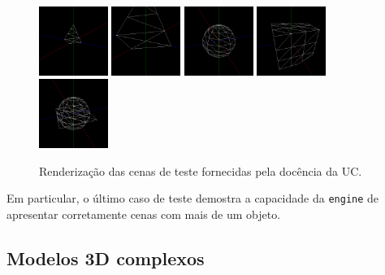 \documentclass[12pt, a4paper]{article}
\begin{document}
\begin{figure}[H]
    \begin{adjustwidth}{-2cm}{-2cm} %
        \centering
        \includegraphics[width=0.20\textwidth]{res/phase1/results/Test1.png}
        \includegraphics[width=0.20\textwidth]{res/phase1/results/Test2.png}
        \includegraphics[width=0.20\textwidth]{res/phase1/results/Test3.png}
        \includegraphics[width=0.20\textwidth]{res/phase1/results/Test4.png}
        \includegraphics[width=0.20\textwidth]{res/phase1/results/Test5.png}
        \caption{Renderização das cenas de teste fornecidas pela docência da UC.}
    \end{adjustwidth}
\end{figure}

Em particular, o último caso de teste demostra a capacidade da \texttt{engine} de apresentar
corretamente cenas com mais de um objeto.

\subsection{Modelos 3D complexos}
\end{document}
